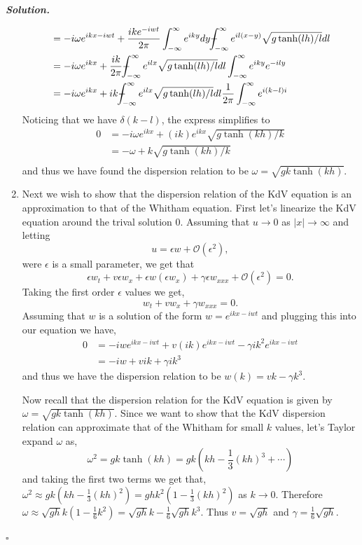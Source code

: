 \documentclass[12pt]{report}
\def\Xint#1{\mathchoice
   {\XXint\displaystyle\textstyle{#1}}%
   {\XXint\textstyle\scriptstyle{#1}}%
   {\XXint\scriptstyle\scriptscriptstyle{#1}}%
   {\XXint\scriptscriptstyle\scriptscriptstyle{#1}}%
   \!\int}
\def\XXint#1#2#3{{\setbox0=\hbox{$#1{#2#3}{\int}$}
     \vcenter{\hbox{$#2#3$}}\kern-.5\wd0}}
\def\dashint{\Xint-}
\newenvironment{solution}[1][\it{Solution}]{\textbf{#1. } }{$\square$}
\def\O{{\mathcal{O}}}
\def\dashint{\Xint-}
\begin{document}
\begin{solution}
\begin{enumerate}
\begin{align*}
                &= -i\omega e^{ikx - iwt} + \frac{ike^{-iwt}}{2\pi} \int_{-\infty}^{\infty} e^{iky} dy \dashint_{-\infty}^{\infty}e^{il(x-y)}\sqrt{g\tanh(lh)/l}dl \\
                &= -i\omega e^{ikx} + \frac{ik}{2\pi} \dashint_{-\infty}^{\infty} e^{ilx}\sqrt{g\tanh(lh)/l}dl \int_{-\infty}^{\infty}e^{iky}e^{-ily}\\
                &= -i\omega e^{ikx}+ ik \dashint_{-\infty}^{\infty} e^{ilx}\sqrt{g\tanh(lh)/l}dl \frac{1}{2\pi} \int_{-\infty}^{\infty}e^{i(k-l)i}
            \end{align*}
            Noticing that we have $\delta(k - l)$, the express simplifies to
            \begin{align*}
                 0 &= -i\omega e^{ikx} + (ik)e^{ikx}\sqrt{g\tanh(kh)/k}\\
                 &= -\omega + k \sqrt{g\tanh(kh)/k}\\
            \end{align*}
            and thus we have found the dispersion relation to be $\omega = \sqrt{gk\tanh(kh)}$.
            \item Next we wish to show that the dispersion relation of the KdV equation is an approximation to that of the Whitham equation. First let's linearize the KdV equation around the trival solution $0$. Assuming that $u \rightarrow 0$ as $|x| \rightarrow \infty$ and letting \[ u = \epsilon w + \O(\epsilon^2),\]
            were $\epsilon$ is a small parameter, we get that
            \[
                \epsilon w_t + v \epsilon w_x + \epsilon w(\epsilon w_x) + \gamma \epsilon w_{xxx} + \O(\epsilon^2) = 0.
            \]
            Taking the first order $\epsilon$ values we get,
            \[
                w_t + vw_x + \gamma w_{xxx} = 0.
            \]
            Assuming that $w$ is a solution of the form $w = e^{ikx - iwt}$ and plugging this into our equation we have,
            \begin{align*}
                0 &= -iwe^{ikx - iwt} + v (ik)e^{ikx - iwt} - \gamma ik^2 e^{ikx - iwt}\\
                &= -iw + vik + \gamma ik^3
            \end{align*}      
            and thus we have the dispersion relation to be $w(k) = vk - \gamma k^3$. 
            
            \noindent
            Now recall that the dispersion relation for the KdV equation is given by $\omega = \sqrt{gk\tanh(kh)}$. Since we want to show that the KdV dispersion relation can approximate that of the Whitham for small $k$ values, let's Taylor expand $\omega$ as,
            \[ 
                \omega^2 = gk\tanh(kh) = gk(kh - \frac{1}{3}(kh)^3 + \cdots) \]
            and taking the first two terms we get that, $\omega^2 \approx gk(kh - \frac{1}{3}(kh)^2) = ghk^2(1 - \frac{1}{3}(kh)^2)$ as $k \rightarrow 0$. Therefore $\omega \approx \sqrt{gh}k(1 - \frac{1}{6}k^2) = \sqrt{gh} k - \frac{1}{6} \sqrt{gh}k^3$. Thus $v = \sqrt{gh}$ and $\gamma = \frac{1}{6} \sqrt{gh}$. 
        \end{enumerate}
\end{solution}
\end{document}

